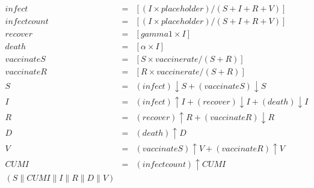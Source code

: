 \begin{eqnarray*}
\mathit{infect} & = & [(I\times \mathit{placeholder})/(S+I+R+V)]\\%
\mathit{infectcount} & = & [(I\times \mathit{placeholder})/(S+I+R+V)]\\%
\mathit{recover} & = & [\mathit{gamma1}\times I]\\%
\mathit{death} & = & [\alpha\times I]\\%
\mathit{vaccinateS} & = & [S\times \mathit{vaccinerate}/(S+R)]\\%
\mathit{vaccinateR} & = & [R\times \mathit{vaccinerate}/(S+R)]\\%
%
S & = & (\mathit{infect}){\downarrow}S + (\mathit{vaccinateS}){\downarrow}S\\%
I & = & (\mathit{infect}){\uparrow}I + (\mathit{recover}){\downarrow}I + (\mathit{death}){\downarrow}I\\%
R & = & (\mathit{recover}){\uparrow}R + (\mathit{vaccinateR}){\downarrow}R\\%
D & = & (\mathit{death}){\uparrow}D\\%
V & = & (\mathit{vaccinateS}){\uparrow}V + (\mathit{vaccinateR}){\uparrow}V\\%
%
\mathit{CUMI} & = & (\mathit{infectcount}){\uparrow}\mathit{CUMI}\\%
%
(S {\parallel} \mathit{CUMI} {\parallel} I {\parallel} R {\parallel} D {\parallel} V)\end{eqnarray*}
